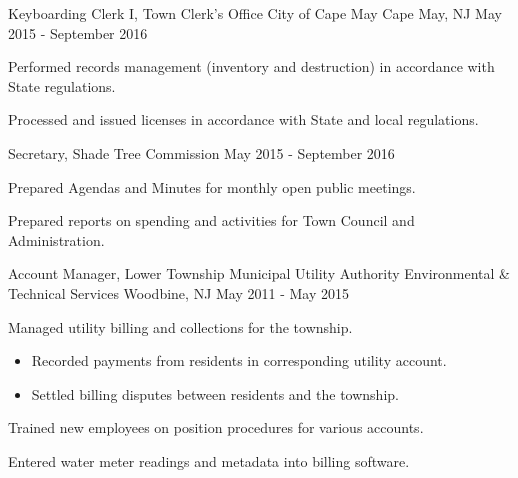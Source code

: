 \begin{cventries}
  \cventry
    {Keyboarding Clerk I, Town Clerk’s Office} %
    {City of Cape May} %
    {Cape May, NJ} %
    {May 2015 - September 2016} %
    {
      \begin{cvitems} %
        \item {Performed records management (inventory and destruction) in accordance with State regulations.}
        \item {Processed and issued licenses in accordance with State and local regulations.}
      \end{cvitems}
    }

  \cventry
    {Secretary, Shade Tree Commission} %
    {} %
    {} %
    {May 2015 - September 2016} %
    {
      \begin{cvitems} %
        \item {Prepared Agendas and Minutes for monthly open public meetings.}
        \item {Prepared reports on spending and activities for Town Council and Administration.}
      \end{cvitems}
    }

  \cventry
    {Account Manager, Lower Township Municipal Utility Authority} %
    {Environmental \& Technical Services} %
    {Woodbine, NJ} %
    {May 2011 - May 2015} %
    {
      \begin{cvitems} %
        \item {Managed utility billing and collections for the township.}
        \begin{itemize}
          \item {Recorded payments from residents in corresponding utility account.}
          \item {Settled billing disputes between residents and the township.}
        \end{itemize}
        \item {Trained new employees on position procedures for various accounts.}
        \item {Entered water meter readings and metadata into billing software.}
      \end{cvitems}
    }

\end{cventries}
